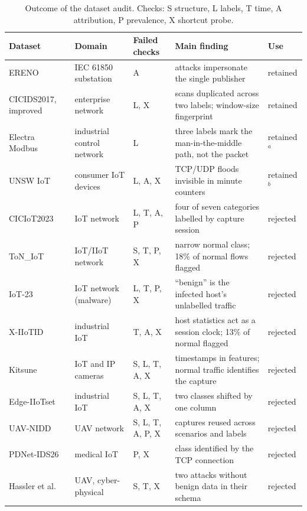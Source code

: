 \begin{table}[t]
\centering
\caption{Outcome of the dataset audit. Checks: S structure, L labels, T time,
A attribution, P prevalence, X shortcut probe.}
\label{tab:dataset-audit}
\small
\begin{tabular}{@{}lllll@{}}
\toprule
Dataset & Domain & Failed checks & Main finding & Use \\
\midrule
ERENO~\cite{quincozes2023ereno} & IEC 61850 substation & A &
  attacks impersonate the single publisher & retained \\
CICIDS2017, improved~\cite{liu2022error} & enterprise network & L, X &
  scans duplicated across two labels; window-size fingerprint & retained \\
Electra Modbus~\cite{perales2019electra} & industrial control network & L &
  three labels mark the man-in-the-middle path, not the packet & retained$^{a}$ \\
UNSW IoT~\cite{hamza2019unsw} & consumer IoT devices & L, A, X &
  TCP/UDP floods invisible in minute counters & retained$^{b}$ \\
\midrule
CICIoT2023~\cite{neto2023ciciot2023} & IoT network & L, T, A, P &
  four of seven categories labelled by capture session & rejected \\
ToN\_IoT~\cite{moustafa2021toniot} & IoT/IIoT network & S, T, P, X &
  narrow normal class; 18\% of normal flows flagged & rejected \\
IoT-23~\cite{garcia2020iot23} & IoT network (malware) & L, T, P, X &
  ``benign'' is the infected host's unlabelled traffic & rejected \\
X-IIoTID~\cite{alhawawreh2022xiiotid} & industrial IoT & T, A, X &
  host statistics act as a session clock; 13\% of normal flagged & rejected \\
Kitsune~\cite{mirsky2018kitsune} & IoT and IP cameras & S, L, T, A, X &
  timestamps in features; normal traffic identifies the capture & rejected \\
Edge-IIoTset~\cite{ferrag2022edgeiiotset} & industrial IoT & S, L, T, A, X &
  two classes shifted by one column & rejected \\
UAV-NIDD~\cite{hadi2025uavnidd} & UAV network & S, L, T, A, P, X &
  captures reused across scenarios and labels & rejected \\
PDNet-IDS26~\cite{lui2026pdnet} & medical IoT & P, X &
  class identified by the TCP connection & rejected \\
Hassler et al.~\cite{hassler2024uav} & UAV, cyber-physical & S, T, X &
  two attacks without benign data in their schema & rejected \\

\end{tabular}
\end{table}
